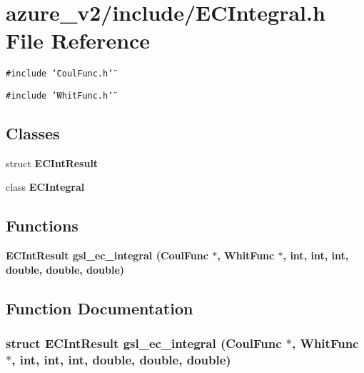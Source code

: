 \section{azure\_\-v2/include/ECIntegral.h File Reference}
\label{ECIntegral_8h}
{\tt \#include \char`\"{}Coul\-Func.h\char`\"{}}\par
{\tt \#include \char`\"{}Whit\-Func.h\char`\"{}}\par
\subsection*{Classes}
\begin{CompactItemize}
\item 
struct \bf{ECInt\-Result}
\item 
class \bf{ECIntegral}
\end{CompactItemize}
\subsection*{Functions}
\begin{CompactItemize}
\item 
\bf{ECInt\-Result} \bf{gsl\_\-ec\_\-integral} (\bf{Coul\-Func} $\ast$, \bf{Whit\-Func} $\ast$, int, int, int, double, double, double)
\end{CompactItemize}


\subsection{Function Documentation}
\subsubsection{\setlength{\rightskip}{0pt plus 5cm}struct \bf{ECInt\-Result} gsl\_\-ec\_\-integral (\bf{Coul\-Func} $\ast$, \bf{Whit\-Func} $\ast$, int, int, int, double, double, double)}\label{ECIntegral_8h_066597f6148960fcd985e0b24205a010}


